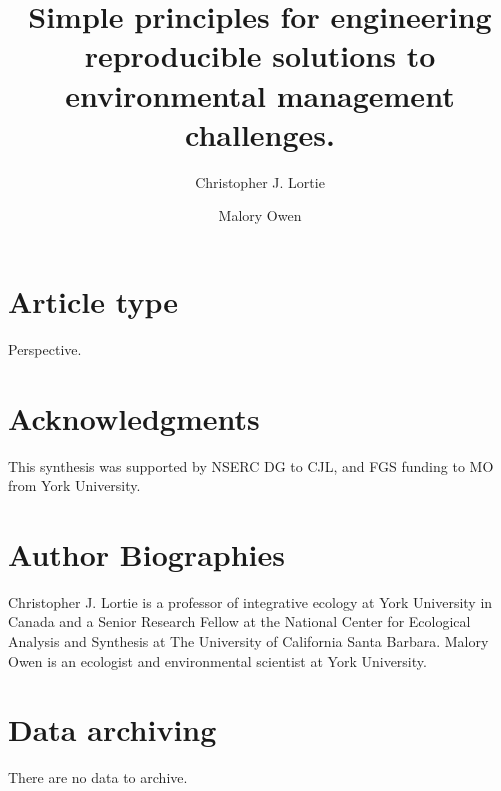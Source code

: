\documentclass[fleqn,10pt]{wlpeerj} %
\title{Simple principles for engineering reproducible solutions to
environmental management challenges.}
\author[1]{Christopher J. Lortie}
\author[1]{Malory Owen}
\affil[1]{Biology, York University, 4700 Keele St.~Toronto, ON, Canada, M3J1P3}
\begin{document}
\flushbottom
\maketitle
\thispagestyle{empty}

\hypertarget{article-type}{%
\section*{Article type}\label{article-type}}

Perspective.

\hypertarget{acknowledgments}{%
\section*{Acknowledgments}\label{acknowledgments}}

This synthesis was supported by NSERC DG to CJL, and FGS funding to MO
from York University.

\hypertarget{author-biographies}{%
\section*{Author Biographies}\label{author-biographies}}

Christopher J. Lortie is a professor of integrative ecology at York
University in Canada and a Senior Research Fellow at the National Center
for Ecological Analysis and Synthesis at The University of California
Santa Barbara. Malory Owen is an ecologist and environmental scientist
at York University.

\hypertarget{data-archiving}{%
\section*{Data archiving}\label{data-archiving}}

There are no data to archive.
\end{document}
